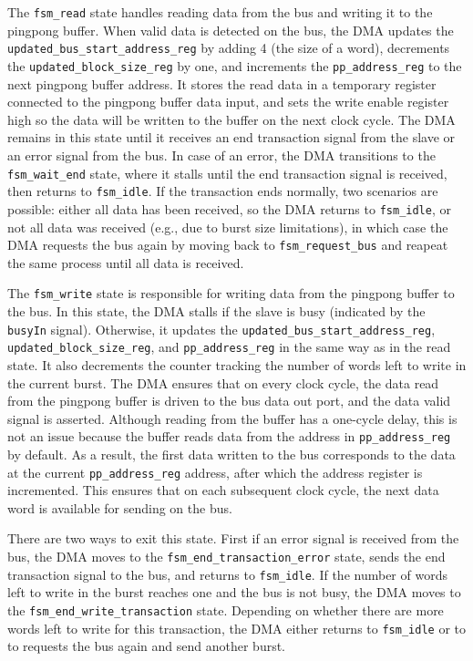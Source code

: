 \documentclass[a4paper,11pt,oneside]{report}
\begin{document}
The \texttt{fsm\_read} state handles reading data from the bus and writing it to the pingpong buffer.  
When valid data is detected on the bus, the DMA updates the \texttt{updated\_bus\_start\_address\_reg} by adding 4 (the size of a word),  
decrements the \texttt{updated\_block\_size\_reg} by one,  
and increments the \texttt{pp\_address\_reg} to the next pingpong buffer address.  
It stores the read data in a temporary register connected to the pingpong buffer data input,  
and sets the write enable register high so the data will be written to the buffer on the next clock cycle.  
The DMA remains in this state until it receives an end transaction signal from the slave or an error signal from the bus.  
In case of an error, the DMA transitions to the \texttt{fsm\_wait\_end} state, where it stalls until the end transaction signal is received, then returns to \texttt{fsm\_idle}.  
If the transaction ends normally, two scenarios are possible:  
either all data has been received, so the DMA returns to \texttt{fsm\_idle},  
or not all data was received (e.g., due to burst size limitations), in which case the DMA requests the bus again by moving back to \texttt{fsm\_request\_bus} and reapeat the same process until all data is received.

The \texttt{fsm\_write} state is responsible for writing data from the pingpong buffer to the bus.  
In this state, the DMA stalls if the slave is busy (indicated by the \texttt{busyIn} signal).  
Otherwise, it updates the \texttt{updated\_bus\_start\_address\_reg}, \texttt{updated\_block\_size\_reg}, and \texttt{pp\_address\_reg} in the same way as in the read state.  
It also decrements the counter tracking the number of words left to write in the current burst.  
The DMA ensures that on every clock cycle, the data read from the pingpong buffer is driven to the bus data out port, and the data valid signal is asserted.  
Although reading from the buffer has a one-cycle delay, this is not an issue because the buffer reads data from the address in \texttt{pp\_address\_reg} by default.  
As a result, the first data written to the bus corresponds to the data at the current \texttt{pp\_address\_reg} address, after which the address register is incremented. 
This ensures that on each subsequent clock cycle, the next data word is available for sending on the bus.

There are two ways to exit this state.  
First if an error signal is received from the bus, the DMA moves to the \texttt{fsm\_end\_transaction\_error} state, sends the end transaction signal to the bus, and returns to \texttt{fsm\_idle}.  
If the number of words left to write in the burst reaches one and the bus is not busy, the DMA moves to the \texttt{fsm\_end\_write\_transaction} state.  
Depending on whether there are more words left to write for this transaction, the DMA either returns to \texttt{fsm\_idle} or to  to requests the bus again and send another burst.
\end{document}
